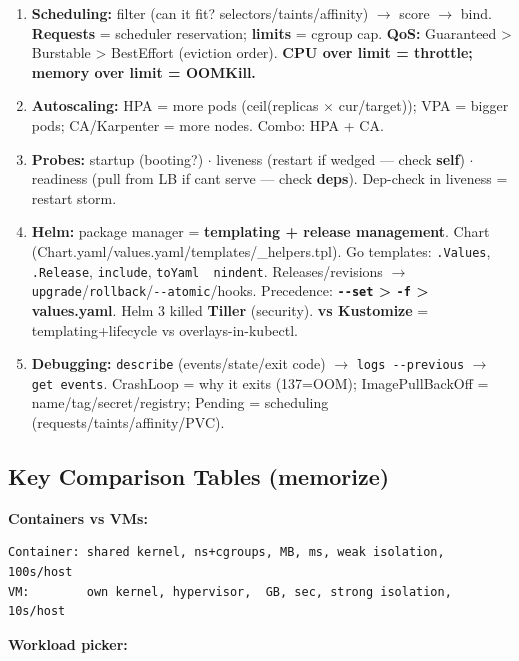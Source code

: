 \documentclass[11pt]{article}
\begin{document}
\begin{enumerate}
\item
  \textbf{Scheduling:} filter (can it fit? selectors/taints/affinity) \(\rightarrow\) score \(\rightarrow\) bind. \textbf{Requests} = scheduler reservation; \textbf{limits} = cgroup cap. \textbf{QoS:} Guaranteed \textgreater{} Burstable \textgreater{} BestEffort (eviction order). \textbf{CPU over limit = throttle; memory over limit = OOMKill.}
\item
  \textbf{Autoscaling:} HPA = more pods (ceil(replicas \(\times\) cur/target)); VPA = bigger pods; CA/Karpenter = more nodes. Combo: HPA + CA.
\item
  \textbf{Probes:} startup (booting?) \(\cdot\) liveness (restart if wedged --- check \textbf{self}) \(\cdot\) readiness (pull from LB if can\textquotesingle t serve --- check \textbf{deps}). Dep-check in liveness = restart storm.
\item
  \textbf{Helm:} package manager = \textbf{templating + release management}. Chart (Chart.yaml/values.yaml/templates/\_helpers.tpl). Go templates: \texttt{.Values}, \texttt{.Release}, \texttt{include}, \texttt{toYaml\ \textbar{}\ nindent}. Releases/revisions \(\rightarrow\) \texttt{upgrade}/\texttt{rollback}/\texttt{-\/-atomic}/hooks. Precedence: \textbf{\texttt{-\/-set} \textgreater{} \texttt{-f} \textgreater{} values.yaml}. Helm 3 killed \textbf{Tiller} (security). \textbf{vs Kustomize} = templating+lifecycle vs overlays-in-kubectl.
\item
  \textbf{Debugging:} \texttt{describe} (events/state/exit code) \(\rightarrow\) \texttt{logs\ -\/-previous} \(\rightarrow\) \texttt{get\ events}. CrashLoop = why it exits (137=OOM); ImagePullBackOff = name/tag/secret/registry; Pending = scheduling (requests/taints/affinity/PVC).
\end{enumerate}

\subsection{Key Comparison Tables (memorize)}\label{key-comparison-tables-memorize}

\textbf{Containers vs VMs:}

\setcodelang{}

\begin{verbatim}
Container: shared kernel, ns+cgroups, MB, ms, weak isolation, 100s/host
VM:        own kernel, hypervisor,  GB, sec, strong isolation, 10s/host
\end{verbatim}

\textbf{Workload picker:}
\end{document}
